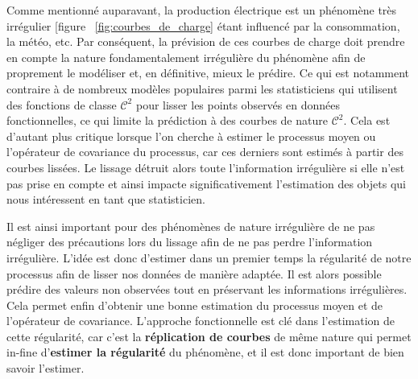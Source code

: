 Comme mentionné auparavant, la production électrique est un phénomène très irrégulier [figure ~\ref{fig:courbes_de_charge} étant influencé par la consommation, la météo, etc. Par conséquent, la prévision de ces courbes de charge doit prendre en compte la nature fondamentalement irrégulière du phénomène afin de proprement le modéliser et, en définitive, mieux le prédire. 
Ce qui est notamment contraire à de nombreux modèles populaires parmi les statisticiens qui utilisent des fonctions de classe $\mathcal C^2$ pour lisser les points observés en données fonctionnelles, ce qui limite la prédiction à des courbes de nature $\mathcal C^2$. 
Cela est d'autant plus critique lorsque l'on cherche à estimer le processus moyen ou l'opérateur de covariance du processus, car ces derniers sont estimés à partir des courbes lissées. 
Le lissage détruit alors toute l'information irrégulière si elle n'est pas prise en compte et ainsi impacte significativement l'estimation des objets qui nous intéressent en tant que statisticien.




Il est ainsi important pour des phénomènes de nature irrégulière de ne pas négliger des précautions lors du lissage afin de ne pas perdre l'information irrégulière. L'idée est donc d'estimer dans un premier temps la régularité de notre processus afin de lisser nos données de manière adaptée. Il est alors possible prédire des valeurs non observées tout en préservant les informations irrégulières. Cela permet enfin d'obtenir une bonne estimation du processus moyen et de l'opérateur de covariance. L'approche fonctionnelle est clé dans l'estimation de cette régularité, car c'est la \textbf{réplication de courbes} de même nature qui permet in-fine d'\textbf{estimer la régularité} du phénomène, et il est donc important de bien savoir l'estimer.

